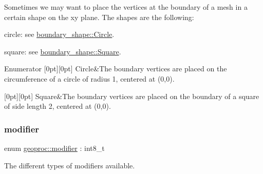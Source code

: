 Sometimes we may want to place the vertices at the boundary of a mesh in a certain shape on the xy plane. The shapes are the following\+:
\begin{DoxyItemize}
\item circle\+: see \hyperlink{namespacegeoproc_a494da744a805b80f842402f0a806ccfca30954d90085f6eaaf5817917fc5fecb3}{boundary\+\_\+shape\+::\+Circle}.
\item square\+: see \hyperlink{namespacegeoproc_a494da744a805b80f842402f0a806ccfcaceb46ca115d05c51aa5a16a8867c3304}{boundary\+\_\+shape\+::\+Square}. 
\end{DoxyItemize}\begin{DoxyEnumFields}{Enumerator}
[0pt][0pt]{}\mbox{\label{namespacegeoproc_a494da744a805b80f842402f0a806ccfca30954d90085f6eaaf5817917fc5fecb3}} 
Circle&The boundary vertices are placed on the circumference of a circle of radius 1, centered at (0,0). \\
\hline

[0pt][0pt]{}\mbox{\label{namespacegeoproc_a494da744a805b80f842402f0a806ccfcaceb46ca115d05c51aa5a16a8867c3304}} 
Square&The boundary vertices are placed on the boundary of a square of side length 2, centered at (0,0). \\
\hline

\end{DoxyEnumFields}
\mbox{\label{namespacegeoproc_a396280579199558902594f4df72c01c7}} 
\subsubsection{\texorpdfstring{modifier}{modifier}}
{\footnotesize\ttfamily enum \hyperlink{namespacegeoproc_a396280579199558902594f4df72c01c7}{geoproc\+::modifier} \+: int8\+\_\+t\hspace{0.3cm}{\ttfamily [strong]}}



The different types of modifiers available. 



